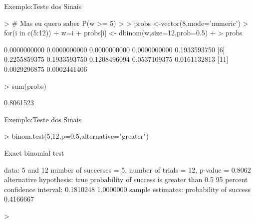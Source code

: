 \documentclass{beamer}
\begin{document}
  
\begin{frame}[fragile]{Exemplo:Teste dos Sinais}

\begin{Schunk}
\begin{Sinput}
> # Mas eu quero saber P(w >= 5)
> 
> probs <-vector(8,mode='numeric')
> for(i in c(5:12)){
+   w=i
+   probs[i] <- dbinom(w,size=12,prob=0.5)
+ }
> probs
\end{Sinput}
\begin{Soutput}
 [1] 0.0000000000 0.0000000000 0.0000000000 0.0000000000 0.1933593750
 [6] 0.2255859375 0.1933593750 0.1208496094 0.0537109375 0.0161132813
[11] 0.0029296875 0.0002441406
\end{Soutput}
\begin{Sinput}
> sum(probs)
\end{Sinput}
\begin{Soutput}
[1] 0.8061523
\end{Soutput}
\end{Schunk}

\end{frame} 

\begin{frame}[fragile]{Exemplo:Teste dos Sinais}

\begin{Schunk}
\begin{Sinput}
> binom.test(5,12,p=0.5,alternative="greater")
\end{Sinput}
\begin{Soutput}
	Exact binomial test

data:  5 and 12
number of successes = 5, number of trials = 12, p-value = 0.8062
alternative hypothesis: true probability of success is greater than 0.5
95 percent confidence interval:
 0.1810248 1.0000000
sample estimates:
probability of success 
             0.4166667 
\end{Soutput}
\begin{Sinput}
> 
\end{Sinput}
\end{Schunk}

\end{frame} 
\end{document}

